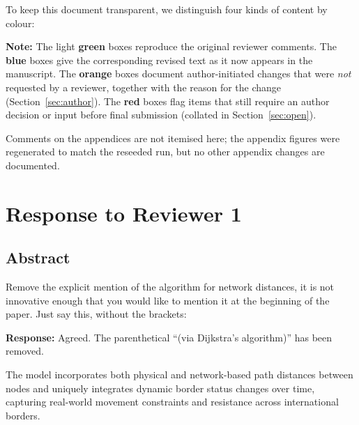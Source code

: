 \documentclass[11pt,a4paper]{article}
\begin{document}
To keep this document transparent, we distinguish four kinds of content by colour:

\vspace{0.5em}
\noindent\textbf{Note:} The light \textbf{green} boxes reproduce the original reviewer comments. The
\textbf{blue} boxes give the corresponding revised text as it now appears in the manuscript. The
\textbf{orange} boxes document author-initiated changes that were \emph{not} requested by a reviewer, together
with the reason for the change (Section~\ref{sec:author}). The \textbf{red} boxes flag items that still
require an author decision or input before final submission (collated in Section~\ref{sec:open}).

\vspace{0.5em}
\noindent Comments on the appendices are not itemised here; the appendix figures were regenerated to match
the reseeded run, but no other appendix changes are documented.

\newpage

\section*{Response to Reviewer 1}

\subsection*{Abstract}

\begin{reviewbox}
Remove the explicit mention of the algorithm for network distances, it is not innovative enough that you would like to mention it at the beginning of the paper. Just say this, without the brackets:
\end{reviewbox}

\textbf{Response:} Agreed. The parenthetical ``(via Dijkstra's algorithm)'' has been removed.

\vspace{0.3cm}
\begin{updatebox}
The model incorporates both physical and network-based path distances between nodes and uniquely
integrates dynamic border status changes over time, capturing real-world movement constraints and
resistance across international borders.
\end{updatebox}
\end{document}
